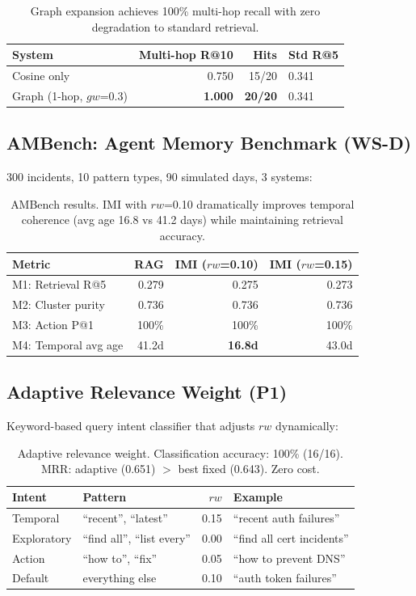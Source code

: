 \documentclass[11pt]{article}
\begin{document}
\begin{table}[h]
\centering
\begin{tabular}{lrrl}
\toprule
System & Multi-hop R@10 & Hits & Std R@5 \\
\midrule
Cosine only & 0.750 & 15/20 & 0.341 \\
Graph (1-hop, $gw$=0.3) & \textbf{1.000} & \textbf{20/20} & 0.341 \\
\bottomrule
\end{tabular}
\caption{Graph expansion achieves 100\% multi-hop recall with zero degradation
to standard retrieval.}
\label{tab:graph}
\end{table}

\subsection{AMBench: Agent Memory Benchmark (WS-D)}

300 incidents, 10 pattern types, 90 simulated days, 3 systems:

\begin{table}[h]
\centering
\begin{tabular}{lrrr}
\toprule
Metric & RAG & IMI ($rw$=0.10) & IMI ($rw$=0.15) \\
\midrule
M1: Retrieval R@5 & 0.279 & 0.275 & 0.273 \\
M2: Cluster purity & 0.736 & 0.736 & 0.736 \\
M3: Action P@1 & 100\% & 100\% & 100\% \\
M4: Temporal avg age & 41.2d & \textbf{16.8d} & 43.0d \\
\bottomrule
\end{tabular}
\caption{AMBench results. IMI with $rw$=0.10 dramatically improves temporal
coherence (avg age 16.8 vs 41.2 days) while maintaining retrieval accuracy.}
\label{tab:ambench}
\end{table}

\subsection{Adaptive Relevance Weight (P1)}

Keyword-based query intent classifier that adjusts $rw$ dynamically:

\begin{table}[h]
\centering
\begin{tabular}{llrl}
\toprule
Intent & Pattern & $rw$ & Example \\
\midrule
Temporal & ``recent'', ``latest'' & 0.15 & ``recent auth failures'' \\
Exploratory & ``find all'', ``list every'' & 0.00 & ``find all cert incidents'' \\
Action & ``how to'', ``fix'' & 0.05 & ``how to prevent DNS'' \\
Default & everything else & 0.10 & ``auth token failures'' \\
\bottomrule
\end{tabular}
\caption{Adaptive relevance weight. Classification accuracy: 100\% (16/16).
MRR: adaptive (0.651) $>$ best fixed (0.643). Zero cost.}
\label{tab:adaptive}
\end{table}
\end{document}
